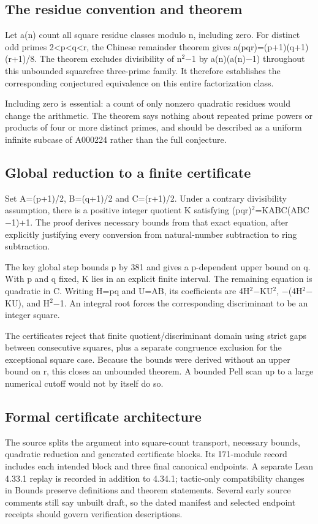 \documentclass[11pt,a4paper]{article}
\begin{document}
\subsection{The residue convention and theorem}
Let a(n) count all square residue classes modulo n, including zero. For distinct odd primes 2<p<q<r, the Chinese remainder theorem gives a(pqr)=(p+1)(q+1)(r+1)/8. The theorem excludes divisibility of n\ensuremath{^2}\ensuremath{-}1 by a(n)(a(n)\ensuremath{-}1) throughout this unbounded squarefree three-prime family. It therefore establishes the corresponding conjectured equivalence on this entire factorization class.

Including zero is essential: a count of only nonzero quadratic residues would change the arithmetic. The theorem says nothing about repeated prime powers or products of four or more distinct primes, and should be described as a uniform infinite subcase of A000224 rather than the full conjecture.

\subsection{Global reduction to a finite certificate}
Set A=(p+1)/2, B=(q+1)/2 and C=(r+1)/2. Under a contrary divisibility assumption, there is a positive integer quotient K satisfying (pqr)\ensuremath{^2}=KABC(ABC\ensuremath{-}1)+1. The proof derives necessary bounds from that exact equation, after explicitly justifying every conversion from natural-number subtraction to ring subtraction.

The key global step bounds p by 381 and gives a p-dependent upper bound on q. With p and q fixed, K lies in an explicit finite interval. The remaining equation is quadratic in C. Writing H=pq and U=AB, its coefficients are 4H\ensuremath{^2}\ensuremath{-}KU\ensuremath{^2}, \ensuremath{-}(4H\ensuremath{^2}\ensuremath{-}KU), and H\ensuremath{^2}\ensuremath{-}1. An integral root forces the corresponding discriminant to be an integer square.

The certificates reject that finite quotient/discriminant domain using strict gaps between consecutive squares, plus a separate congruence exclusion for the exceptional square case. Because the bounds were derived without an upper bound on r, this closes an unbounded theorem. A bounded Pell scan up to a large numerical cutoff would not by itself do so.

\subsection{Formal certificate architecture}
The source splits the argument into square-count transport, necessary bounds, quadratic reduction and generated certificate blocks. Its 171-module record includes each intended block and three final canonical endpoints. A separate Lean 4.33.1 replay is recorded in addition to 4.34.1; tactic-only compatibility changes in Bounds preserve definitions and theorem statements. Several early source comments still say unbuilt draft, so the dated manifest and selected endpoint receipts should govern verification descriptions.
\end{document}

